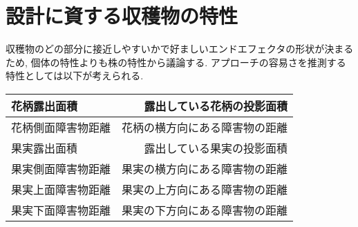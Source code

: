 \section{設計に資する収穫物の特性}
収穫物のどの部分に接近しやすいかで好ましいエンドエフェクタの形状が決まるため, 個体の特性よりも株の特性から議論する.
アプローチの容易さを推測する特性としては以下が考えられる.

\begin{center}
\begin{tabular}{|lr|} \hline
  花柄露出面積 & 露出している花柄の投影面積\\ \hline
  花柄側面障害物距離 & 花柄の横方向にある障害物の距離\\ \hline
  果実露出面積 & 露出している果実の投影面積\\ \hline
  果実側面障害物距離 & 果実の横方向にある障害物の距離\\ \hline
  果実上面障害物距離 & 果実の上方向にある障害物の距離\\ \hline
  果実下面障害物距離 & 果実の下方向にある障害物の距離\\ \hline
\end{tabular}
\end{center}
